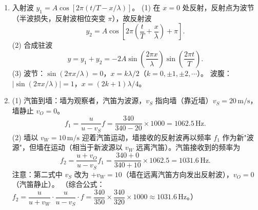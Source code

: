\documentclass[12pt]{article}
\begin{document}
\begin{enumerate}[label=\textbf{例\arabic*.}, leftmargin=*]
\item 入射波 $y_1 = A\cos[2\pi(t/T - x/\lambda)]$。
(1) 在 $x=0$ 处反射，反射点为波节（半波损失，反射波相位突变 $\pi$），故反射波
\[
  y_2 = A\cos\!\left[2\pi\!\left(\frac{t}{T}+\frac{x}{\lambda}\right)+\pi\right].
\]
(2) 合成驻波
\[
  y = y_1+y_2 = -2A\sin\!\left(\frac{2\pi x}{\lambda}\right)\sin\!\left(\frac{2\pi t}{T}\right).
\]
(3) 波节：$\sin(2\pi x/\lambda)=0$，$x = k\lambda/2$（$k=0,\pm 1,\pm 2,\cdots$）。
波腹：$|\sin(2\pi x/\lambda)|=1$，$x = (2k+1)\lambda/4$。

\item (1) 汽笛到墙：墙为观察者，汽笛为波源，$v_S$ 指向墙（靠近墙）$v_S=20\,\mathrm{m/s}$，墙静止 $v_O=0$。
\[
  f_1 = \frac{u}{u-v_S}f = \frac{340}{340-20}\times 1000 = 1062.5\,\mathrm{Hz}.
\]
(2) 墙以 $v_W=10\,\mathrm{m/s}$ 迎着汽笛运动，墙接收的反射波再以频率 $f_1$ 作为新"波源"，但墙在运动（相当于新波源以 $v_W$ 远离汽笛）。汽笛接收到的频率为
\[
  f_2 = \frac{u+v_O}{u-v_S}f_1
  = \frac{340+0}{340+10}\times 1062.5 = 1031.6\,\mathrm{Hz}.
\]
注意：第二式中 $v_S$ 改为 $+v_W=10$（墙在远离汽笛方向发出反射波），$v_O=0$（汽笛静止）。
（综合公式：$f_2 = \dfrac{u}{u+v_W}\cdot\dfrac{u}{u-v_S}\cdot f = \dfrac{340}{350}\times\dfrac{340}{320}\times 1000 \approx 1031.6\,\mathrm{Hz}$。）

\end{enumerate}
\end{document}
